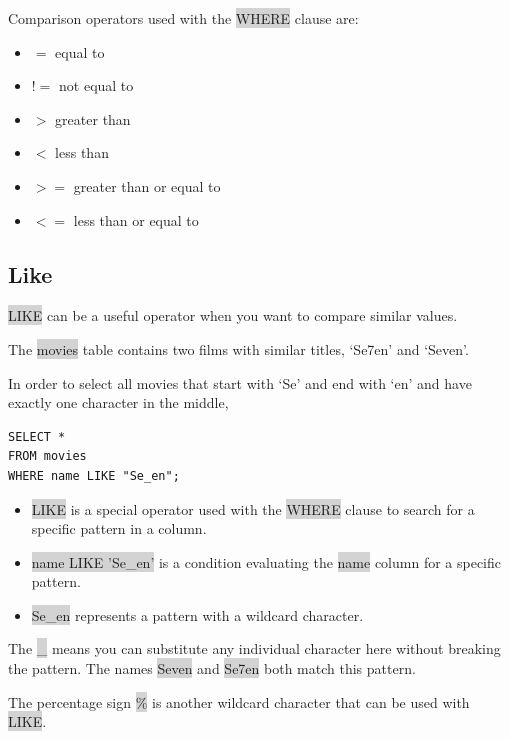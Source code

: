 \documentclass[11pt]{article}
\begin{document}
{{Comparison operators used with the \colorbox{lightgray}{WHERE} clause are:
\begin{itemize}
\item $=$ equal to
\item $!$$=$ not equal to
\item $>$ greater than
\item $<$ less than
\item $>$$=$ greater than or equal to
\item $<$$=$ less than or equal to
\end{itemize}

\subsection{Like}
\colorbox{lightgray}{LIKE} can be a useful operator when you want to compare similar values.

The \colorbox{lightgray}{movies} table contains two films with similar titles, ‘Se7en’ and ‘Seven’.

In order to select all movies that start with ‘Se’ and end with ‘en’ and have exactly one character in the middle, 
\begin{lstlisting}
SELECT * 
FROM movies
WHERE name LIKE "Se_en";
\end{lstlisting}
\begin{itemize}[leftmargin = *]
\item \colorbox{lightgray}{LIKE} is a special operator used with the \colorbox{lightgray}{WHERE} clause to search for a specific pattern in a column.
\item \colorbox{lightgray}{name LIKE 'Se\_en'} is a condition evaluating the \colorbox{lightgray}{name} column for a specific pattern.
\item \colorbox{lightgray}{Se\_en} represents a pattern with a wildcard character.
\end{itemize}
The \colorbox{lightgray}{\_} means you can substitute any individual character here without breaking the pattern. The names \colorbox{lightgray}{Seven} and \colorbox{lightgray}{Se7en} both match this pattern.

The percentage sign \colorbox{lightgray}{\%} is another wildcard character that can be used with \colorbox{lightgray}{LIKE}.

}}
\end{document}
